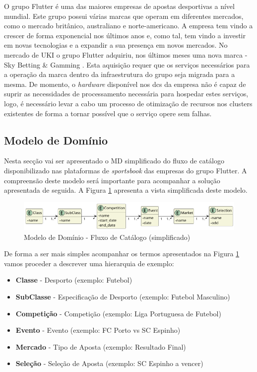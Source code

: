 O grupo Flutter é uma das maiores empresas de apostas desportivas a nível mundial. Este grupo
possui várias marcas que operam em diferentes mercados, como o mercado britânico, australiano e
norte-americano. A empresa tem vindo a crescer de forma exponencial nos últimos anos e, como tal,
tem vindo a investir em novas tecnologias e a expandir a sua presença em novos mercados. No mercado
de \ac{UKI} o grupo Flutter adquiriu, nos últimos meses uma nova marca - Sky Betting \& Gamming
\cite{skybet}. Esta aquisição requer que os serviços necessários para a operação da marca dentro
da infraestrutura do grupo seja migrada para a mesma. De momento, o \textit{hardware} disponível
nos \glspl{dc} da empresa não é capaz de suprir as necessidades de processamento necessária para 
hospedar estes serviços, logo, é necessário levar a cabo um processo de otimização de recursos 
nos \glspl{cluster} existentes de forma a tornar possível que o serviço opere sem falhas.

\subsection{Modelo de Domínio}

Nesta secção vai ser apresentado o \ac{MD} simplificado do fluxo de catálogo disponibilizado nas 
plataformas de \textit{sportsbook} das empresas do grupo Flutter. A compreensão deste modelo será
importante para acompanhar a solução apresentada de seguida. A Figura \ref{md} apresenta a vista
simplificada deste modelo.

\begin{figure}[H]
  \centerline{\includegraphics[scale=0.4]{media/content/analise/dm.png}}
  \caption{Modelo de Domínio - Fluxo de Catálogo (simplificado)}
  \label{md}
\end{figure}

De forma a ser mais simples acompanhar os termos apresentados na Figura \ref{md} vamos proceder 
a descrever uma hierarquia de exemplo:

\begin{itemize}
  \item \textbf{Classe} - Desporto (exemplo: Futebol)
  \item \textbf{SubClasse} - Especificação de Desporto (exemplo: Futebol Masculino)
  \item \textbf{Competição} - Competição (exemplo: Liga Portuguesa de Futebol)
  \item \textbf{Evento} - Evento (exemplo: FC Porto vs SC Espinho)
  \item \textbf{Mercado} - Tipo de Aposta (exemplo: Resultado Final)
  \item \textbf{Seleção} - Seleção de Aposta (exemplo: SC Espinho a vencer)
\end{itemize}

